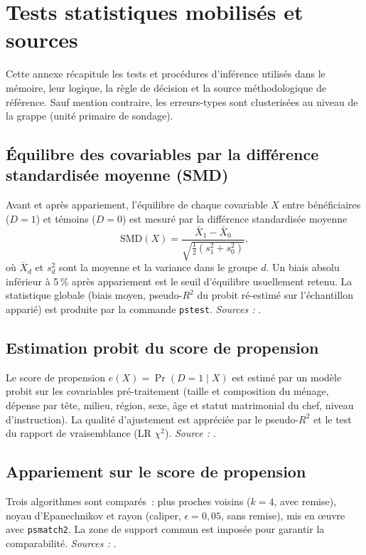 \section{Tests statistiques mobilisés et sources}
\label{ann:G}

Cette annexe récapitule les tests et procédures d'inférence utilisés dans le
mémoire, leur logique, la règle de décision et la source méthodologique de
référence. Sauf mention contraire, les erreurs-types sont clusterisées au
niveau de la grappe (unité primaire de sondage).

\subsection{Équilibre des covariables par la différence standardisée moyenne (SMD)}

Avant et après appariement, l'équilibre de chaque covariable $X$ entre
bénéficiaires ($D=1$) et témoins ($D=0$) est mesuré par la différence
standardisée moyenne
\[
  \mathrm{SMD}(X) = \frac{\bar{X}_{1} - \bar{X}_{0}}
       {\sqrt{\tfrac{1}{2}\left(s_{1}^{2} + s_{0}^{2}\right)}},
\]
où $\bar{X}_{d}$ et $s_{d}^{2}$ sont la moyenne et la variance dans le groupe
$d$. Un biais absolu inférieur à 5\,\% après appariement est le seuil
d'équilibre usuellement retenu. La statistique globale (biais moyen,
pseudo-$R^2$ du probit ré-estimé sur l'échantillon apparié) est produite par
la commande \texttt{pstest}. \textit{Sources :}
\textcite{rosenbaum1983,austin2009}.

\subsection{Estimation probit du score de propension}

Le score de propension $e(X)=\Pr(D=1\mid X)$ est estimé par un modèle probit
sur les covariables pré-traitement (taille et composition du ménage,
dépense par tête, milieu, région, sexe, âge et statut matrimonial du chef,
niveau d'instruction). La qualité d'ajustement est appréciée par le
pseudo-$R^2$ et le test du rapport de vraisemblance (LR $\chi^2$).
\textit{Source :} \textcite{rosenbaum1983}.

\subsection{Appariement sur le score de propension}

Trois algorithmes sont comparés~: plus proches voisins ($k=4$, avec remise),
noyau d'Epanechnikov et rayon (caliper, $\epsilon = 0{,}05$, sans
remise), mis en \oe uvre avec \texttt{psmatch2}. La zone de support commun
est imposée pour garantir la comparabilité. \textit{Sources :}
\textcite{rosenbaum1983,heckman1997,heckman1998,caliendo2008}.

